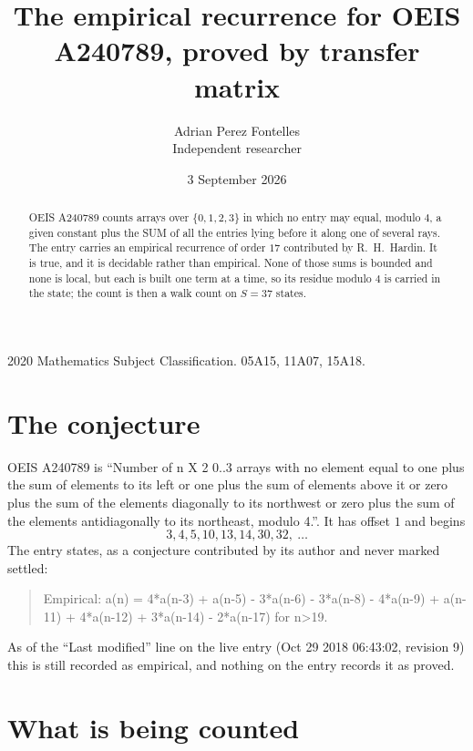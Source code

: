 \documentclass[11pt,a4paper]{article}
\title{The empirical recurrence for OEIS A240789, proved by transfer matrix}
\author{Adrian Perez Fontelles\\ \small Independent researcher}
\date{3 September 2026}
\theoremstyle{plain}
\theoremstyle{definition}
\begin{document}
\maketitle

\begin{abstract}
OEIS A240789 counts arrays over $\{0,1,2,3\}$ in which no entry may equal, modulo $4$, a given
constant plus the SUM of all the entries lying before it along one of several rays. The entry
carries an empirical recurrence of order $17$ contributed by R.~H.~Hardin. It is true, and
it is decidable rather than empirical. None of those sums is bounded and none is local, but
each is built one term at a time, so its residue modulo $4$ is carried in the state; the
count is then a walk count on $S=37$ states.
\end{abstract}

\noindent\small 2020 Mathematics Subject Classification. 05A15, 11A07, 15A18.\normalsize

\section{The conjecture}

OEIS A240789 is ``Number of n X 2 0..3 arrays with no element equal to one plus the sum of elements to its left or one plus the sum of elements above it or zero plus the sum of the elements diagonally to its northwest or zero plus the sum of the elements antidiagonally to its northeast, modulo 4.''. It has offset $1$ and begins
\[
3, 4, 5, 10, 13, 14, 30, 32,\ \dots
\]
The entry states, as a conjecture contributed by its author and never marked settled:
\begin{quote}
Empirical: a(n) = 4*a(n-3) + a(n-5) - 3*a(n-6) - 3*a(n-8) - 4*a(n-9) + a(n-11) + 4*a(n-12) + 3*a(n-14) - 2*a(n-17) for n>19.
\end{quote}
As of the ``Last modified'' line on the live entry (Oct 29 2018 06:43:02, revision 9) this is still
recorded as empirical, and nothing on the entry records it as proved.

\section{What is being counted}
\end{document}
